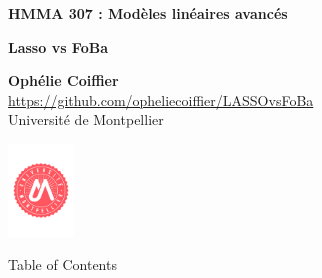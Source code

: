 \documentclass[unknownkeysallowed]{beamer}
\begin{document}



\begin{frame}
\bigskip
\bigskip
\begin{center}{
\LARGE\color{marron}
\textbf{HMMA 307 : Modèles linéaires avancés}}
\vspace{0.5cm}


\color{marron}
\textbf{Lasso vs FoBa}
\end{center}

\vspace{0.5cm}

\begin{center}
\textbf{Ophélie Coiffier} \\
\vspace{0.1cm}
\url{https://github.com/opheliecoiffier/LASSOvsFoBa}\\
\vspace{0.5cm}
Université de Montpellier \\
\end{center}

\centering
\includegraphics[width=0.13\textwidth]{./images/Logo.pdf}

\end{frame}






\begin{frame}{Table of Contents}
\tableofcontents[hideallsubsections]
\end{frame}
\end{document}
